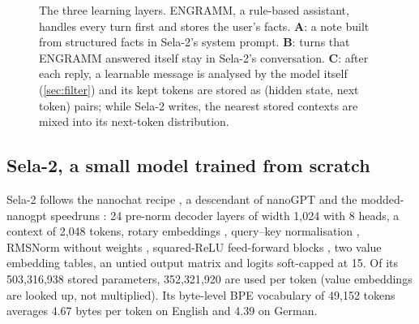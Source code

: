 \documentclass[10pt,twocolumn]{article}
\begin{document}
\begin{figure}[t]
\caption{The three learning layers. ENGRAMM, a rule-based assistant, handles every turn first and stores the user's
facts. \textbf{A}: a note built from structured facts in Sela-2's system prompt. \textbf{B}: turns that ENGRAMM answered
itself stay in Sela-2's conversation. \textbf{C}: after each reply, a learnable message is analysed by the model itself
(\cref{sec:filter}) and its kept tokens are stored as (hidden state, next token) pairs; while Sela-2 writes, the nearest
stored contexts are mixed into its next-token distribution.}
\label{fig:system}
\end{figure}

\subsection{Sela-2, a small model trained from scratch}\label{sec:sela}

Sela-2 follows the nanochat recipe \citep{karpathy2025nanochat}, a descendant of nanoGPT \citep{karpathy2022nanogpt} and
the modded-nanogpt speedruns \citep{jordan2024modded}: 24 pre-norm decoder layers of width 1{,}024 with 8 heads, a
context of 2{,}048 tokens, rotary embeddings \citep{su2024roformer}, query--key normalisation \citep{henry2020qknorm},
RMSNorm without weights \citep{zhang2019rmsnorm}, squared-ReLU feed-forward blocks \citep{so2021primer}, two value
embedding tables, an untied output matrix and logits soft-capped at 15. Of its 503{,}316{,}938 stored parameters,
352{,}321{,}920 are used per token (value embeddings are looked up, not multiplied). Its byte-level BPE vocabulary
\citep{sennrich2016bpe} of 49{,}152 tokens averages 4.67 bytes per token on English and 4.39 on German.
\end{document}
